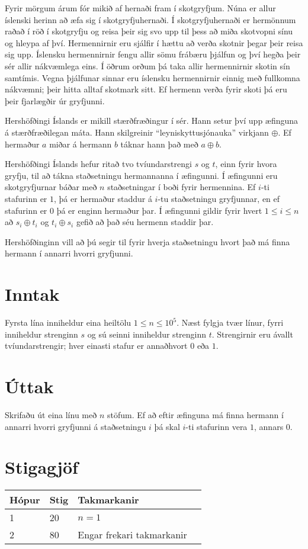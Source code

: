 
\noindent
Fyrir mörgum árum fór mikið af hernaði fram í skotgryfjum. Núna er allur íslenski herinn að æfa sig í skotgryfjuhernaði.
Í skotgryfjuhernaði er hermönnum raðað í röð í skotgryfju og reisa þeir sig svo upp til þess að miða skotvopni sínu og hleypa af því.
Hermennirnir eru sjálfir í hættu að verða skotnir þegar þeir reisa sig upp.
Íslensku hermennirnir fengu allir sömu frábæru þjálfun og því hegða þeir sér allir nákvæmlega eins. Í öðrum orðum þá taka allir hermennirnir skotin sín samtímis.
Vegna þjálfunar sinnar eru íslensku hermennirnir einnig með fullkomna nákvæmni; þeir hitta alltaf skotmark sitt.
Ef hermenn verða fyrir skoti þá eru þeir fjarlægðir úr gryfjunni.

Hershöfðingi Íslands er mikill stærðfræðingur í sér. Hann setur því upp æfinguna á stærðfræðilegan máta.
Hann skilgreinir ``leyniskyttusjónauka'' virkjann $\oplus$. Ef hermaður $a$ miðar á hermann $b$ táknar hann það með $a \oplus b$.

Hershöfðingi Íslands hefur ritað tvo tvíundarstrengi $s$ og $t$, einn fyrir hvora gryfju, til að tákna staðsetningu hermannanna í æfingunni.
Í æfingunni eru skotgryfjurnar báðar með $n$ staðsetningar í boði fyrir hermennina.
Ef $i$-ti stafurinn er $1$, þá er hermaður staddur á $i$-tu staðsetningu gryfjunnar, en ef stafurinn er $0$ þá er enginn hermaður þar.
Í æfingunni gildir fyrir hvert $1 \leq i \leq n$ að $s_i \oplus t_i$ og $t_i \oplus s_i$ gefið að það séu hermenn staddir þar.

Hershöfðinginn vill að þú segir til fyrir hverja staðsetningu hvort það má finna hermann í annarri hvorri gryfjunni.

\section*{Inntak}
Fyrsta lína inniheldur eina heiltölu $1 \le n \le 10^5$.
Næst fylgja tvær línur, fyrri inniheldur strenginn $s$ og sú seinni inniheldur strenginn $t$. Strengirnir eru ávallt tvíundarstrengir; hver einasti stafur er annaðhvort $0$ eða $1$.

\section*{Úttak}
Skrifaðu út eina línu með $n$ stöfum. Ef að eftir æfinguna má finna hermann í annarri hvorri gryfjunni á staðsetningu $i$ þá skal $i$-ti stafurinn vera $1$, annars $0$.

\section*{Stigagjöf}
\begin{tabular}{|l|l|l|l|}
\hline
Hópur & Stig & Takmarkanir \\ \hline
1     & 20    & $n = 1$\\ \hline
2     & 80    & Engar frekari takmarkanir \\ \hline
\end{tabular}
